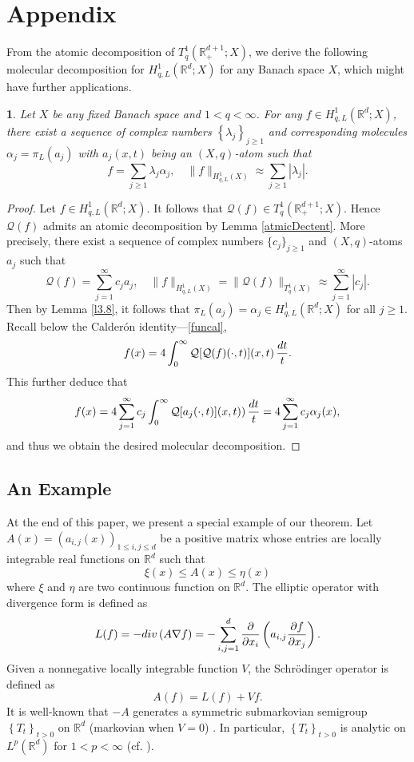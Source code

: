 \documentclass[oneside,english,a4wide]{amsart}
\numberwithin{equation}{section}
\numberwithin{figure}{section}
\theoremstyle{plain}
\newtheorem{thm}{\protect\theoremname}[section]
\theoremstyle{plain}
\theoremstyle{definition}
\theoremstyle{plain}
\theoremstyle{remark}
\theoremstyle{definition}
\theoremstyle{remark}
\theoremstyle{definition}
\providecommand{\theoremname}{Theorem}
\newcommand{\real}{{\mathbb R}}
\newcommand{\Q}{{\mathcal Q}}
\newcommand{\8}{+\infty}
\renewcommand{\1}{\mathbbm{1}}
\newcommand\sk[1]{ \left( #1 \right) }
\newcommand\lk[1]{ \left\{ #1 \right\} }
\renewcommand\d{{\rm d}}
\begin{document}
{\section{Appendix}
From the atomic decomposition of $T^1_q(\real^{d+1}_+; X)$, we derive the following molecular decomposition for $H^1_{q, L}(\real^d; X)$ for any Banach space $X$, which might have further applications.

\begin{thm}\label{atomdec}
Let $X$ be any fixed Banach space and $1<q<\infty$. For any $f \in H^1_{q, L}(\real^d; X)$, there exist a sequence of complex numbers $\lk{ 
\lambda_j }_{j \geq 1}$ and corresponding molecules $\alpha_j = \pi_L(a_j)$ with $a_j(x, t)$ being an $(X, q)$-atom such that
\[
    f = \sum_{j \geq 1}\lambda_j \alpha_j, \quad \|f\|_{H^1_{q, L}(X)} \approx \sum_{j \geq 1} |\lambda_j|.
\]
\end{thm}
\begin{proof}
    Let $f \in H^1_{q, L}(\real^d; X)$. It follows that $\Q(f) \in T^1_q(\real^{d+1}_+; X)$. Hence $\Q(f)$ admits an atomic decomposition by Lemma \ref{atmicDectent}. More precisely, there exist a sequence of complex numbers $\{ c_j \}_{j \geq 1}$ and $(X, q)$-atoms $a_j$ such that
    \[
        \Q(f) = \sum_{j =1}^{\infty} c_j a_j, \quad \| f \|_{H^1_{q, L}(X)} = \| \Q(f) \|_{T^1_q(X)} \approx \sum_{j = 1}^{\infty} |c_j|.
    \]
    Then by Lemma \ref{l3.8}, it follows that $\pi_L(a_j) =\alpha_j \in H^1_{q, L}(\real^d; X)$ for all $j \geq 1$. Recall below the Calder\'on identity---\eqref{funcal}, 
        \[
        f(x) = 4\int_0^{\infty} \Q[\Q(f)(\cdot, t)](x, t) \,\frac{\d t}{t}.
    \]
This further deduce that
    \[
        f(x) =  4\sum_{j =1}^{\infty} c_j \int_0^{\infty} \Q[a_j(\cdot, t)](x, t))\, \frac{\d t}{t} = 4\sum_{j =1}^{\infty} c_j\alpha_j(x),
    \]
    and thus we obtain the desired molecular decomposition. 
\end{proof}

\iffalse

\subsection{An Example}
At the end of this paper, we present a special example of our theorem. Let $A(x) = (a_{i, j}(x))_{1 \leq i, j \leq d}$ be a positive matrix whose entries are locally integrable real functions on $\real^d$ such that
\[
    \xi(x) \leq A(x) \leq \eta(x)
\]
where $\xi$ and $\eta$ are two continuous function on $\real^d$. The elliptic operator with divergence form is defined as
\[
    L(f) = - {\rm div} \sk{ A \nabla f } = - \sum_{ i, j = 1 }^d \frac{\partial }{ \partial x_i } \sk{ a_{i, j} \frac{\partial f}{ \partial x_j } }.
\]
Given a nonnegative locally integrable function $V$, the Schr\"{o}dinger operator is defined as 
\[
    A(f) = L(f) + Vf.
\]
It is well-known that $-A$ generates a symmetric submarkovian semigroup $\lk{ T_t }_{t > 0}$ on $\real^d$ (markovian when $V = 0$) . In particular, $\lk{T_t}_{t > 0}$ is analytic on $L^p(\real^d)$ for $1 < p < \infty$ (cf. \cite[Theorem 1.8.1]{Davies1989}). 

}
\end{document}
